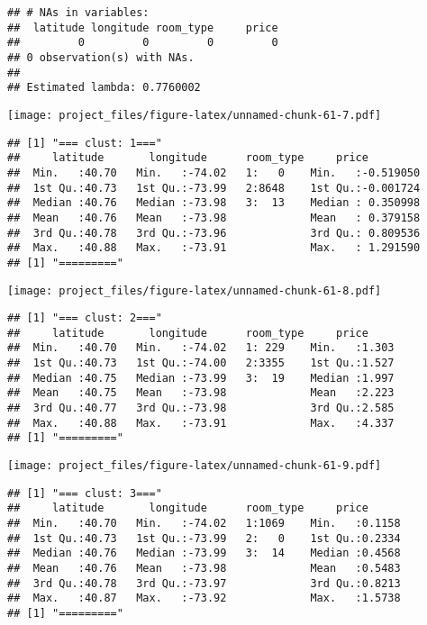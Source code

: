 \documentclass[
]{article}
\begin{document}
\begin{verbatim}
## # NAs in variables:
##  latitude longitude room_type     price 
##         0         0         0         0 
## 0 observation(s) with NAs.
## 
## Estimated lambda: 0.7760002
\end{verbatim}

\texttt{[image: project\_files/figure-latex/unnamed-chunk-61-7.pdf]}

\begin{verbatim}
## [1] "=== clust: 1==="
##     latitude       longitude      room_type     price          
##  Min.   :40.70   Min.   :-74.02   1:   0    Min.   :-0.519050  
##  1st Qu.:40.73   1st Qu.:-73.99   2:8648    1st Qu.:-0.001724  
##  Median :40.76   Median :-73.98   3:  13    Median : 0.350998  
##  Mean   :40.76   Mean   :-73.98             Mean   : 0.379158  
##  3rd Qu.:40.78   3rd Qu.:-73.96             3rd Qu.: 0.809536  
##  Max.   :40.88   Max.   :-73.91             Max.   : 1.291590  
## [1] "========="
\end{verbatim}

\texttt{[image: project\_files/figure-latex/unnamed-chunk-61-8.pdf]}

\begin{verbatim}
## [1] "=== clust: 2==="
##     latitude       longitude      room_type     price      
##  Min.   :40.70   Min.   :-74.02   1: 229    Min.   :1.303  
##  1st Qu.:40.73   1st Qu.:-74.00   2:3355    1st Qu.:1.527  
##  Median :40.75   Median :-73.99   3:  19    Median :1.997  
##  Mean   :40.75   Mean   :-73.98             Mean   :2.223  
##  3rd Qu.:40.77   3rd Qu.:-73.98             3rd Qu.:2.585  
##  Max.   :40.88   Max.   :-73.91             Max.   :4.337  
## [1] "========="
\end{verbatim}

\texttt{[image: project\_files/figure-latex/unnamed-chunk-61-9.pdf]}

\begin{verbatim}
## [1] "=== clust: 3==="
##     latitude       longitude      room_type     price       
##  Min.   :40.70   Min.   :-74.02   1:1069    Min.   :0.1158  
##  1st Qu.:40.73   1st Qu.:-73.99   2:   0    1st Qu.:0.2334  
##  Median :40.76   Median :-73.99   3:  14    Median :0.4568  
##  Mean   :40.76   Mean   :-73.98             Mean   :0.5483  
##  3rd Qu.:40.78   3rd Qu.:-73.97             3rd Qu.:0.8213  
##  Max.   :40.87   Max.   :-73.92             Max.   :1.5738  
## [1] "========="
\end{verbatim}
\end{document}
